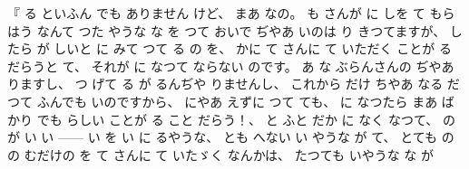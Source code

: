 %
『
る
といふん
でも
ありません
けど、
%
まあ
なの。
%
も
さんが
に
しを
て
もらはう
なんて
つた
やうな
な
を
%
つて
おいで
ぢやあ
いのは
り
きつてますが、
%
したら
が%
しいと
に
みて
つて
る
の
を、
%
かに
て
さんに
て
いただく%
ことが
る
だらうと
て、
%
それが
に
なつて
ならない
のです。
%
あ
な
ぶらんさんの
ぢやあ
りますし、
%
つ
げて
る
が
るんぢや
りませんし、
%
これから
だけ
ちやあ
なる
だつて
ふんでも
いのですから、
%
にやあ
えずに
つて
ても、
%
に
なつたら
まあ
%
ばかり
でも
らしい
ことが
る
こと
だらう！、
%
と
ふと
だか
に
なく
なつて、
%
の
が
い
い%
{---}{---}%
%
い
を
い
に
るやうな、
%
とも
へない
い
やうな
が
て、
%
とても
の%
の
むだけの
を
て
さんに
て
いたゞく
なんかは、
%
たつても
いやうな
な
が
